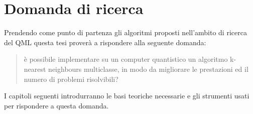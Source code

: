 \section{Domanda di ricerca} %

Prendendo come punto di partenza gli algoritmi proposti nell'ambito di ricerca del \ac{QML} 
questa tesi proverà a rispondere alla seguente domanda:
\begin{quote}
    è possibile implementare su un computer quantistico un algoritmo k-nearest neighbours 
    multiclasse, in modo da migliorare le prestazioni ed il numero di problemi risolvibili?
\end{quote}
I capitoli seguenti introdurranno le basi teoriche necessarie e gli strumenti usati 
per rispondere a questa domanda. 

